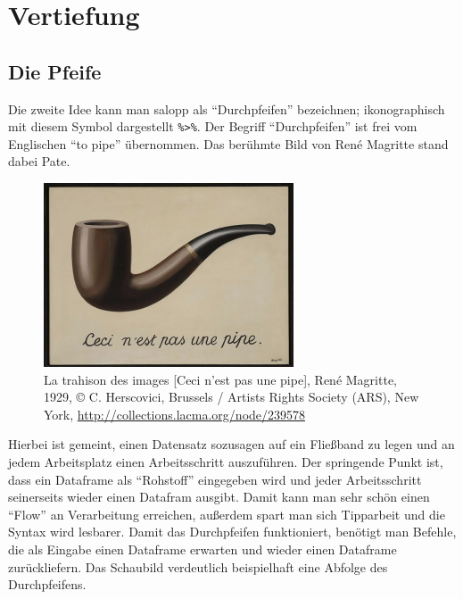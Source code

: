 \documentclass[12pt,ngerman,paper=a4,pagesize,DIV=13]{scrreprt}
\begin{document}
\hypertarget{vertiefung}{%
\section{Vertiefung}\label{vertiefung}}

\hypertarget{die-pfeife}{%
\subsection{Die Pfeife}\label{die-pfeife}}

Die zweite Idee kann man salopp als \enquote{Durchpfeifen} bezeichnen;
ikonographisch mit diesem Symbol dargestellt
\texttt{\%\textgreater{}\%}. Der Begriff \enquote{Durchpfeifen} ist frei
vom Englischen \enquote{to pipe} übernommen. Das berühmte Bild von René
Magritte stand dabei Pate.

\begin{figure}
\centering
\includegraphics{Inhalte/images/Datenjudo/ma-150089-WEB.pdf}
\caption{La trahison des images {[}Ceci n'est pas une pipe{]}, René
Magritte, 1929, © C. Herscovici, Brussels / Artists Rights Society
(ARS), New York, \url{http://collections.lacma.org/node/239578}}
\end{figure}

Hierbei ist gemeint, einen Datensatz sozusagen auf ein Fließband zu
legen und an jedem Arbeitsplatz einen Arbeitsschritt auszuführen. Der
springende Punkt ist, dass ein Dataframe als \enquote{Rohstoff}
eingegeben wird und jeder Arbeitsschritt seinerseits wieder einen
Datafram ausgibt. Damit kann man sehr schön einen \enquote{Flow} an
Verarbeitung erreichen, außerdem spart man sich Tipparbeit und die
Syntax wird lesbarer. Damit das Durchpfeifen funktioniert, benötigt man
Befehle, die als Eingabe einen Dataframe erwarten und wieder einen
Dataframe zurückliefern. Das Schaubild verdeutlich beispielhaft eine
Abfolge des Durchpfeifens.
\end{document}
